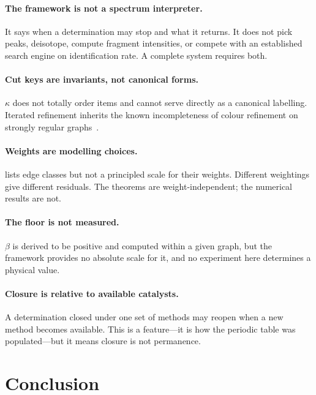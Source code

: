 \documentclass[11pt,a4paper]{article}
\theoremstyle{definition}
\theoremstyle{remark}
\newcommand{\flo}{\beta}                     %
\newcommand{\key}{\kappa}                    %
\begin{document}
\paragraph{The framework is not a spectrum interpreter.} It says when a
determination may stop and what it returns. It does not pick peaks,
deisotope, compute fragment intensities, or compete with an established
search engine on identification rate. A complete system requires both.

\paragraph{Cut keys are invariants, not canonical forms.} $\key$ does not
totally order items and cannot serve directly as a canonical labelling.
Iterated refinement inherits the known incompleteness of colour
refinement on strongly regular
graphs~\citep{weisfeiler1968,cai1992optimal}.

\paragraph{Weights are modelling choices.}  lists edge
classes but not a principled scale for their weights. Different weightings
give different residuals. The theorems are weight-independent; the
numerical results are not.

\paragraph{The floor is not measured.} $\flo$ is derived to be positive
and computed within a given graph, but the framework provides no
absolute scale for it, and no experiment here determines a physical
value.

\paragraph{Closure is relative to available catalysts.} A determination
closed under one set of methods may reopen when a new method becomes
available. This is a feature---it is how the periodic table was
populated---but it means closure is not permanence.

\section{Conclusion}
\label{sec:conclusion}
\end{document}
